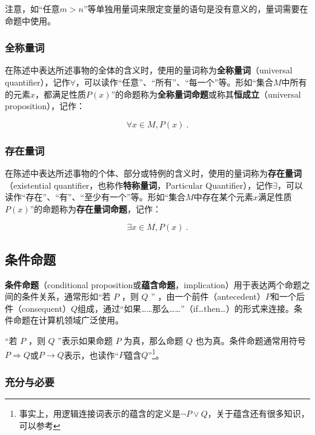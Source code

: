 注意，如“任意$m>n$”等单独用量词来限定变量的语句是没有意义的，量词需要在命题中使用。

\subsubsection{全称量词}

在陈述中表达所述事物的全体的含义时，使用的量词称为\textbf{全称量词}（universal quantifier），记作$\forall$，可以读作“任意”、“所有”、“每一个”等。形如“集合$M$中所有的元素$x$，都满足性质$P(x)$”的命题称为\textbf{全称量词命题}或称其\textbf{恒成立}（universal proposition），记作：


\begin{equation}
\forall x\in M,P(x)~.
\end{equation}

\subsubsection{存在量词}

在陈述中表达所述事物的个体、部分或特例的含义时，使用的量词称为\textbf{存在量词}（existential quantifier，也称作\textbf{特称量词}，Particular Quantifier），记作$\exists$，可以读作“存在”、“有”、“至少有一个”等。形如“集合$M$中存在某个元素$x$满足性质$P(x)$”的命题称为\textbf{存在量词命题}，记作：

\begin{equation}
\exists x\in M,P(x)~.
\end{equation}

\subsection{条件命题}

\textbf{条件命题}（conditional proposition或\textbf{蕴含命题}，implication）用于表达两个命题之间的条件关系，通常形如“若 $P$ ，则 $Q$ ” ，由一个前件（antecedent）$P$和一个后件（consequent）$Q$组成，通过“如果……那么……”（if…then…）的形式来连接。条件命题在计算机领域广泛使用。

“若 $P$ ，则 $Q$ ”表示如果命题 $P$ 为真，那么命题 $Q$ 也为真。条件命题通常用符号$P\Rightarrow Q$或$P\rightarrow Q$表示，也读作“$P$蕴含$Q$”\footnote{事实上，用逻辑连接词表示的蕴含的定义是$\lnot P\lor Q$，关于蕴含还有很多知识，可以参考}。

\subsubsection{充分与必要}

